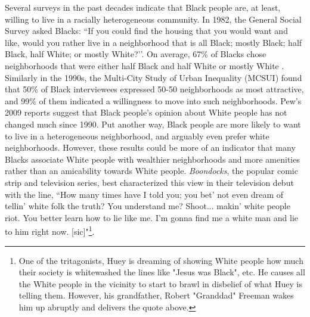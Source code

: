 {Several surveys in the past decades indicate that Black people are, at least, willing to live in a racially heterogeneous community. In 1982, the General Social Survey asked Blacks: ``If you could find the housing that you would want and like, would you rather live in a neighborhood that is all Black; mostly Black; half Black, half White; or mostly White?’’. On average, 67\% of Blacks chose neighborhoods that were either half Black and half White or mostly White \cite{davis92}. Similarly in the 1990s, the Multi-City Study of Urban Inequality (MCSUI) found that 50\% of Black interviewees expressed 50-50 neighborhoods as most attractive, and 99\% of them indicated a willingness to move into such neighborhoods\cite{krysan02}. Pew's 2009 reports suggest that Black people's opinion about White people has not changed much since 1990. Put another way, Black people are more likely to want to live in a heterogeneous neighborhood, and arguably even prefer white neighborhoods. However, these results could be more of an indicator that many Blacks associate White people with wealthier neighborhoods and more amenities rather than an amicability towards White people. \textit{Boondocks}, the popular comic strip and television series,  best characterized this view in their television debut with the line, ``How many times have I told you; you bet' not even dream of tellin' white folk the truth? You understand me? Shoot... makin' white people riot. You better learn how to lie like me. I'm gonna find me a white man and lie to him right now. [sic]"\footnote{One of the tritagonists, Huey is dreaming of showing White people how much their society is whitewashed the lines like "Jesus was Black", etc. He causes all the White people in the vicinity to start to brawl in disbelief of what Huey is telling them.  However, his grandfather, Robert "Granddad" Freeman wakes him up abruptly and delivers the quote above.}\cite{mcgruder05}. 

}

